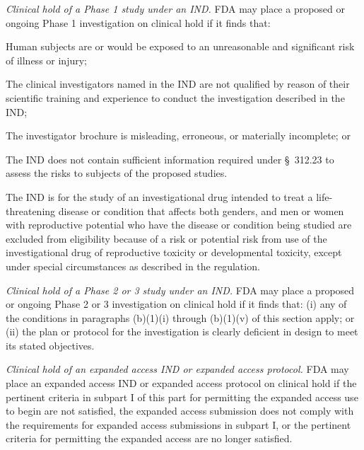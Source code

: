 \begin{description}[leftmargin=0.5cm,style=sameline]
\item[(1)] \textit{Clinical hold of a Phase 1 study under an IND.} FDA may place a proposed or ongoing Phase 1 investigation on clinical hold if it finds that:
\begin{description}[leftmargin=0.8cm,style=sameline]
\item[(i)] Human subjects are or would be exposed to an unreasonable and significant risk of illness or injury;
\item[(ii)] The clinical investigators named in the IND are not qualified by reason of their scientific training and experience to conduct the investigation described in the IND;
\item[(iii)] The investigator brochure is misleading, erroneous, or materially incomplete; or
\item[(iv)] The IND does not contain sufficient information required under \S~312.23 to assess the risks to subjects of the proposed studies.
\item[(v)] The IND is for the study of an investigational drug intended to treat a life-threatening disease or condition that affects both genders, and men or women with reproductive potential who have the disease or condition being studied are excluded from eligibility because of a risk or potential risk from use of the investigational drug of reproductive toxicity or developmental toxicity, except under special circumstances as described in the regulation.
\end{description}

\item[(2)] \textit{Clinical hold of a Phase 2 or 3 study under an IND.} FDA may place a proposed or ongoing Phase 2 or 3 investigation on clinical hold if it finds that: (i) any of the conditions in paragraphs (b)(1)(i) through (b)(1)(v) of this section apply; or (ii) the plan or protocol for the investigation is clearly deficient in design to meet its stated objectives.

\item[(3)] \textit{Clinical hold of an expanded access IND or expanded access protocol.} FDA may place an expanded access IND or expanded access protocol on clinical hold if the pertinent criteria in subpart I of this part for permitting the expanded access use to begin are not satisfied, the expanded access submission does not comply with the requirements for expanded access submissions in subpart I, or the pertinent criteria for permitting the expanded access are no longer satisfied.


\end{description}
